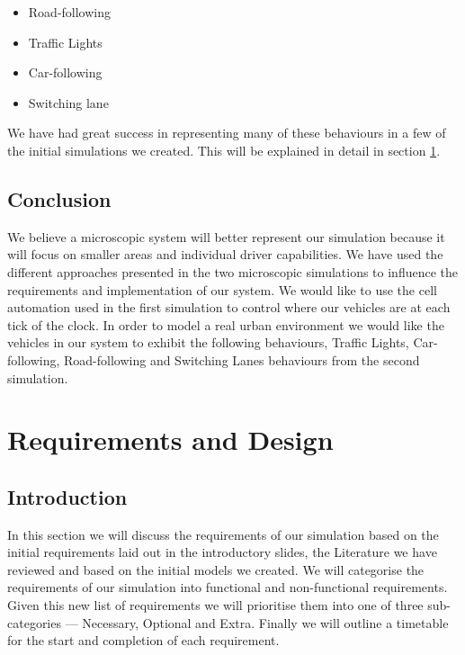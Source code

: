 \documentclass{article}
\begin{document}
	\begin{itemize}
		\item Road-following
		\item Traffic Lights
		\item Car-following
		\item Switching lane
	\end{itemize}
	 We have had great success in representing many of these behaviours in a few of the initial simulations we created. 
	 This will be explained in detail in section \ref{RequirementsAndDeisgn}. 
	
	
	\subsection{Conclusion}
	We believe a microscopic system will better represent our simulation because it will focus on smaller areas and individual driver capabilities. 
	We have used the different approaches presented in the two microscopic simulations to influence the requirements and implementation of our system. 
	We would like to use the cell automation used in the first simulation to control where our vehicles are at each tick of the clock. 
	In order to model a real urban environment we would like the vehicles in our system to exhibit the following behaviours, Traffic Lights, Car-following, Road-following and Switching Lanes behaviours from the second simulation.
	
%	

\section{Requirements and Design}\label{RequirementsAndDeisgn}

\subsection{Introduction}
	In this section we will discuss the requirements of our simulation based on the initial requirements laid out in the introductory slides, the Literature we have reviewed and based on the initial models we created. 
	We will categorise the requirements of our simulation into functional and non-functional requirements. Given this new list of requirements we will prioritise them into one of three sub-categories  --- Necessary, Optional and Extra. 
	Finally we will outline a timetable for the start and completion of each requirement.  
	
\end{document}
